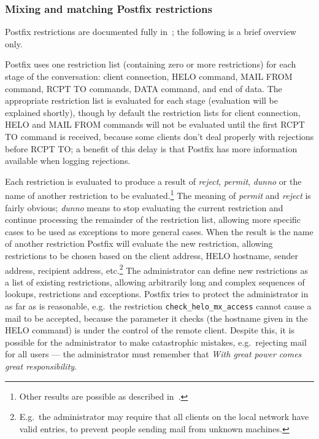 \subsubsection{Mixing and matching Postfix restrictions}

\label{Mixing and matching Postfix restrictions}

Postfix restrictions are documented fully in~\cite{smtpd_access_readme,
smtpd_per_user_control, policy-servers}; the following is a brief overview
only.

Postfix uses one restriction list (containing zero or more restrictions)
for each stage of the \SMTP{} conversation: client connection, HELO
command, MAIL FROM command, RCPT TO commands, DATA command, and end of
data.  The appropriate restriction list is evaluated for each stage
(evaluation will be explained shortly), though by default the restriction
lists for client connection, HELO and MAIL FROM commands will not be
evaluated until the first RCPT TO command is received, because some clients
don't deal properly with rejections before RCPT TO\@; a benefit of this
delay is that Postfix has more information available when logging
rejections.

Each restriction is evaluated to produce a result of \textit{reject},
\textit{permit}, \textit{dunno\/} or the name of another restriction to be
evaluated.\footnote{Other results are possible as described
in~\cite{smtpd_access_readme, smtpd_per_user_control, policy-servers}.} The
meaning of \textit{permit\/} and \textit{reject\/} is fairly obvious;
\textit{dunno\/} means to stop evaluating the current restriction and
continue processing the remainder of the restriction list, allowing more
specific cases to be used as exceptions to more general cases.  When the
result is the name of another restriction Postfix will evaluate the new
restriction, allowing restrictions to be chosen based on the client \IP{}
address, HELO hostname, sender address, recipient address,
etc.\footnote{E.g.\ the administrator may require that all clients on the
local network have valid \DNS{} entries, to prevent people sending mail
from unknown machines.}  The administrator can define new restrictions as a
list of existing restrictions, allowing arbitrarily long and complex
sequences of lookups, restrictions and exceptions.  Postfix tries to
protect the administrator in as far as is reasonable, e.g.\ the restriction
\texttt{check\_helo\_mx\_access} cannot cause a mail to be accepted,
because the parameter it checks (the hostname given in the HELO command) is
under the control of the remote client.  Despite this, it is possible for
the administrator to make catastrophic mistakes, e.g.\ rejecting mail for
all users --- the administrator must remember that \textit{With great power
comes great responsibility}.

